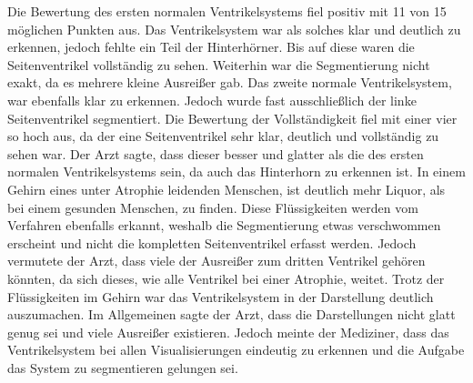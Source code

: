 Die Bewertung des ersten normalen Ventrikelsystems fiel positiv mit 11 von 15 möglichen Punkten aus. Das Ventrikelsystem war als solches klar und deutlich zu erkennen, jedoch fehlte ein Teil der Hinterhörner. Bis auf diese waren die Seitenventrikel vollständig zu sehen. Weiterhin war die Segmentierung nicht exakt, da es mehrere kleine Ausreißer gab.
\newline
Das zweite normale Ventrikelsystem, war ebenfalls klar zu erkennen. Jedoch wurde fast ausschließlich der linke Seitenventrikel segmentiert. Die Bewertung der Vollständigkeit fiel mit einer vier so hoch aus, da der eine Seitenventrikel sehr klar, deutlich und vollständig zu sehen war. Der Arzt sagte, dass dieser besser und glatter als die des ersten normalen Ventrikelsystems sein, da auch das Hinterhorn zu erkennen ist. 
\newline
In einem Gehirn eines unter Atrophie leidenden Menschen, ist deutlich mehr Liquor, als bei einem gesunden Menschen, zu finden. Diese Flüssigkeiten werden vom Verfahren ebenfalls erkannt, weshalb die Segmentierung etwas verschwommen erscheint und nicht die kompletten Seitenventrikel erfasst werden. Jedoch vermutete der Arzt, dass viele der Ausreißer zum dritten Ventrikel gehören könnten, da sich dieses, wie alle Ventrikel bei einer Atrophie, weitet. Trotz der Flüssigkeiten im Gehirn war das Ventrikelsystem in der Darstellung deutlich auszumachen.
\newline
Im Allgemeinen sagte der Arzt, dass die Darstellungen nicht glatt genug sei und viele Ausreißer existieren. Jedoch meinte der Mediziner, dass das Ventrikelsystem bei allen Visualisierungen eindeutig zu erkennen und die Aufgabe das System zu segmentieren gelungen sei.


